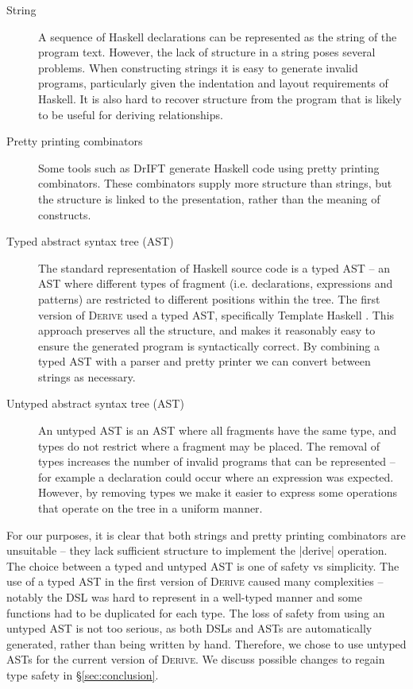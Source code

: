 \documentclass{llncs}
\newcommand{\derive}{\textsc{Derive}}
\begin{document}
\begin{description}
\item[String] A sequence of Haskell declarations can be represented as the string of the program text. However, the lack of structure in a string poses several problems. When constructing strings it is easy to generate invalid programs, particularly given the indentation and layout requirements of Haskell. It is also hard to recover structure from the program that is likely to be useful for deriving relationships.
\item[Pretty printing combinators] Some tools such as DrIFT \cite{drift} generate Haskell code using pretty printing combinators. These combinators supply more structure than strings, but the structure is linked to the presentation, rather than the meaning of constructs.
\item[Typed abstract syntax tree (AST)] The standard representation of Haskell source code is a typed AST -- an AST where different types of fragment (i.e. declarations, expressions and patterns) are restricted to different positions within the tree. The first version of \derive{} used a typed AST, specifically Template Haskell \cite{template_haskell}. This approach preserves all the structure, and makes it reasonably easy to ensure the generated program is syntactically correct. By combining a typed AST with a parser and pretty printer we can convert between strings as necessary.
\item[Untyped abstract syntax tree (AST)] An untyped AST is an AST where all fragments have the same type, and types do not restrict where a fragment may be placed. The removal of types increases the number of invalid programs that can be represented -- for example a declaration could occur where an expression was expected. However, by removing types we make it easier to express some operations that operate on the tree in a uniform manner.
\end{description}

For our purposes, it is clear that both strings and pretty printing combinators are unsuitable -- they lack sufficient structure to implement the |derive| operation. The choice between a typed and untyped AST is one of safety vs simplicity. The use of a typed AST in the first version of \derive{} caused many complexities -- notably the DSL was hard to represent in a well-typed manner and some functions had to be duplicated for each type. The loss of safety from using an untyped AST is not too serious, as both DSLs and ASTs are automatically generated, rather than being written by hand. Therefore, we chose to use untyped ASTs for the current version of \derive{}. We discuss possible changes to regain type safety in \S\ref{sec:conclusion}.
\end{document}
